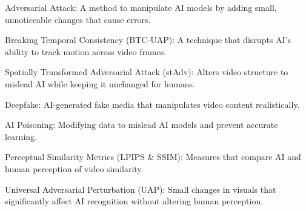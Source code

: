 Adversarial Attack: A method to manipulate AI models by adding small, unnoticeable changes that cause errors.

Breaking Temporal Consistency (BTC-UAP): A technique that disrupts AI’s ability to track motion across video frames.

Spatially Transformed Adversarial Attack (stAdv): Alters video structure to mislead AI while keeping it unchanged for humans.

Deepfake: AI-generated fake media that manipulates video content realistically.

AI Poisoning: Modifying data to mislead AI models and prevent accurate learning.

Perceptual Similarity Metrics (LPIPS \& SSIM): Measures that compare AI and human perception of video similarity.

Universal Adversarial Perturbation (UAP): Small changes in visuals that significantly affect AI recognition without altering human perception.
